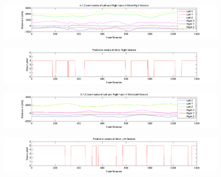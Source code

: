 \begin{figure}
	[h] 	
	\centerline{\includegraphics[width=180mm]{figures/result/test-axis-move-right.jpg}}
\end{figure}
\begin{figure}
	[h] 	
	\centerline{\includegraphics[width=180mm]{figures/result/test-prediction-move-right.jpg}}
\end{figure}
\begin{figure}
	[h] 	
	\centerline{\includegraphics[width=180mm]{figures/result/test-axis-move-left.jpg}}
\end{figure}
\begin{figure}
	[h] 	
	\centerline{\includegraphics[width=180mm]{figures/result/test-prediction-move-left.jpg}}
\end{figure}


